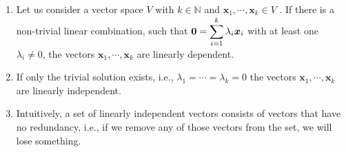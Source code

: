 \begin{enumerate}
    \item 
    \begin{definition}
        Let us consider a vector space $V$ with $k \in \mathbb{N}$ and $\bm{x}_1, \cdots , \bm{x}_k \in V$ . 
        If there is a non-trivial linear combination, such that $\bm{0} = \displaystyle\sum ^k _{i=1} \lambda_i \bm{x}_i$ with at least one $\lambda _i \neq 0$, the vectors  $\bm{x}_1, \cdots , \bm{x}_k$ are linearly dependent. 
        \hfill \cite{mfml/book/mml/Deisenroth-Faisal-Ong}
    \end{definition}
    
    \item If only the trivial solution exists, i.e., $\lambda _1 = \cdots = \lambda _k = 0$ the vectors $\bm{x}_1, \cdots , \bm{x}_k$ are linearly independent.
    \hfill \cite{mfml/book/mml/Deisenroth-Faisal-Ong}

    \item Intuitively, a set of linearly independent vectors consists of vectors that have no redundancy, i.e., if we remove any of those vectors from the set, we will lose something.
    \hfill \cite{mfml/book/mml/Deisenroth-Faisal-Ong}
\end{enumerate}


